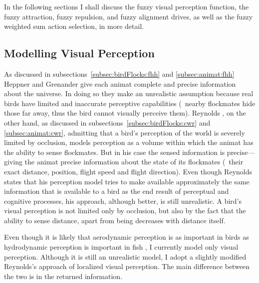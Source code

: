 In the following sections I shall discuss the fuzzy visual perception function, the fuzzy attraction, fuzzy repulsion, and fuzzy alignment drives, as well as the fuzzy weighted sum action selection, in more detail.

\subsection{Modelling Visual Perception}
As discussed in subsections~\ref{subsec:birdFlocks:fhh} and \ref{subsec:animat:fhh} Heppner and Grenander \cite{heppner:1990} give each animat complete and precise information about the universe. In doing so they make an unrealistic assumption because real birds have limited and inaccurate perceptive capabilities (\eg\ nearby flockmates hide those far away, thus the bird cannot visually perceive them). Reynolds \cite{reynolds:1987}, on the other hand, as discussed in subsections~\ref{subsec:birdFlocks:cwr} and \ref{subsec:animat:cwr}, admitting that a bird's perception of the world is severely limited by occlusion, models perception as a volume within which the animat has the ability to sense flockmates. But in his case the sensed information is precise---giving the animat precise information about the state of its flockmates (\ie\ their exact distance, position, flight speed and flight direction). Even though Reynolds \cite{reynolds:1987} states that his perception model tries to make available approximately the same information that is available to a bird as the end result of perceptual and cognitive processes, his approach, although better, is still unrealistic. A bird's visual perception is not limited only by occlusion, but also by the fact that the ability to sense distance, apart from being  decreases with distance itself.

Even though it is likely that aerodynamic perception is as important in birds as hydrodynamic perception is important in fish \cite{ward:2001}, I currently model only visual perception. Although it is still an unrealistic model, I adopt a slightly modified Reynolds's \cite{reynolds:1999} approach of localized visual perception. The main difference between the two is in the returned information.

